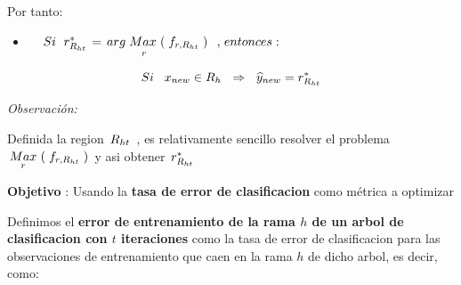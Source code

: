\documentclass[
  11pt,
  a4paper,
]{article}
\providecommand{\tightlist}{%
  \setlength{\itemsep}{0pt}\setlength{\parskip}{0pt}}
\begin{document}
\vspace{0.5cm}

Por tanto:

\begin{itemize}
\tightlist
\item
  \(\hspace{0.4 cm} Si \hspace{0.22 cm} r_{R_{ht}}^* \hspace{0.05 cm}= \hspace{0.05 cm} \underset{\hspace{0.7 cm} r}{arg \hspace{0.1 cm} Max} \hspace{0.05 cm} \left(\hspace{0.1 cm} f_{r, R_{ht}} \hspace{0.1 cm}\right) \hspace{0.2 cm} ,\hspace{0.05 cm} entonces:\)
\end{itemize}

\[Si \hspace{0.3cm} x_{new} \in R_h \hspace{0.22cm}  \Rightarrow  \hspace{0.22cm}  \widehat{y}_{new} = r_{R_{ht}}^*\]

\vspace{0.7cm}

\emph{Observación:}

Definida la region \(\hspace{0.05 cm} R_{ht} \hspace{0.05 cm}\) , es
relativamente sencillo resolver el problema
\(\hspace{0.05 cm} \underset{ r}{ Max} \hspace{0.05 cm} \left(\hspace{0.1 cm} f_{r, R_{ht}} \hspace{0.1 cm}\right) \hspace{0.05 cm}\)
y asi obtener \(\hspace{0.05 cm} r_{R_{ht}}^*\)

\newpage

\textbf{Objetivo} : Usando la \textbf{tasa de error de clasificacion}
como métrica a optimizar

\vspace{0.35cm}

Definimos el \textbf{error de entrenamiento de la rama \(h\) de un arbol
de clasificacion con \(t\) iteraciones} como la tasa de error de
clasificacion para las observaciones de entrenamiento que caen en la
rama \(h\) de dicho arbol, es decir, como:
\end{document}
